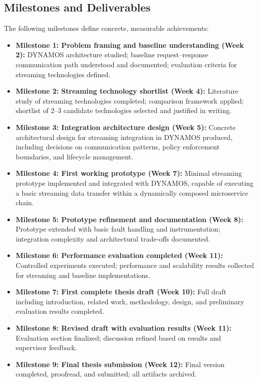 \documentclass[a4paper,10pt,british]{scrartcl}
\begin{document}
\subsection{Milestones and Deliverables}

The following milestones define concrete, measurable achievements:

\begin{itemize}
  \item \textbf{Milestone 1: Problem framing and baseline understanding (Week 2):}  
  DYNAMOS architecture studied; baseline request--response communication path understood and documented; evaluation criteria for streaming technologies defined.

  \item \textbf{Milestone 2:  Streaming technology shortlist (Week 4):}  
  Literature study of streaming technologies completed; comparison framework applied; shortlist of 2--3 candidate technologies selected and justified in writing.

  \item \textbf{Milestone 3:  Integration architecture design (Week 5):}  
  Concrete architectural design for streaming integration in DYNAMOS produced, including decisions on communication patterns, policy enforcement boundaries, and lifecycle management.

  \item \textbf{Milestone 4: First working prototype (Week 7):}  
  Minimal streaming prototype implemented and integrated with DYNAMOS, capable of executing a basic streaming data transfer within a dynamically composed microservice chain.

  \item \textbf{Milestone 5: Prototype refinement and documentation (Week 8):}  
  Prototype extended with basic fault handling and instrumentation; integration complexity and architectural trade-offs documented.

  \item \textbf{Milestone 6: Performance evaluation completed (Week 11):}  
  Controlled experiments executed; performance and scalability results collected for streaming and baseline implementations.

  \item \textbf{Milestone 7: First complete thesis draft (Week 10):}  
  Full draft including introduction, related work, methodology, design, and preliminary evaluation results completed.

  \item \textbf{Milestone 8: Revised draft with evaluation results (Week 11):}  
  Evaluation section finalized; discussion refined based on results and supervisor feedback.

  \item \textbf{Milestone 9: Final thesis submission (Week 12):}  
  Final version completed, proofread, and submitted; all artifacts archived.
\end{itemize}
\end{document}
